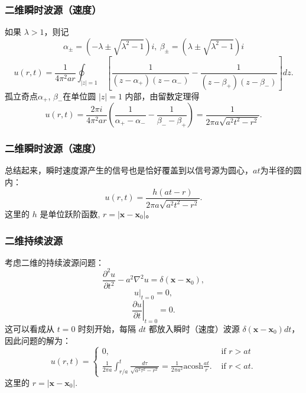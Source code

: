 \documentclass[CJK]{beamer}
\begin{document}
\begin{frame}
  \frametitle{二维瞬时波源（速度）}
  如果 $\lambda>1$，则记 $$\alpha_{\pm} = \left(-\lambda \pm \sqrt{\lambda^2-1}\right)i,\ \beta_{\pm} = \left(\lambda \pm \sqrt{\lambda^2-1}\right)i$$
  $$ u(r,t) = \frac{1}{4\pi^2ar}\oint_{|z|=1}\ \left[\frac{1}{(z-\alpha_+)(z-\alpha_-)}-\frac{1}{(z-\beta_+)(z-\beta_-)}\right]dz.$$
  孤立奇点$\alpha_+$, $\beta_-$在单位圆 $|z|=1$ 内部，由留数定理得
  $$ u(r,t) = \frac{2\pi i}{4\pi^2ar}\left(\frac{1}{\alpha_+-\alpha_-}-\frac{1}{\beta_--\beta_+}\right) = \frac{1}{2\pi a\sqrt{a^2t^2-r^2}}. $$
\end{frame}


\begin{frame}
  \frametitle{二维瞬时波源（速度）}
  总结起来，瞬时速度源产生的信号也是恰好覆盖到以信号源为圆心，$at$为半径的圆内：
  $$ u(r,t) = \frac{h(at-r)}{2\pi a\sqrt{a^2t^2-r^2}}.$$
  这里的 $h$ 是单位跃阶函数, $r=|\mathbf{x}-\mathbf{x}_0|$。
\end{frame}


\begin{frame}
  \frametitle{二维持续波源}
  考虑二维的持续波源问题：
  $$\frac{\partial^2u}{\partial t^2}-a^2\nabla^2 u = \delta(\mathbf{x}-\mathbf{x}_0), $$
  $$\left. u\right\vert_{t=0} = 0,$$
  $$\left. \frac{\partial u}{\partial t}\right\vert_{t=0} = 0.$$
  这可以看成从  $t =0$ 时刻开始，每隔 $dt$ 都放入瞬时（速度）波源 $\delta(\mathbf{x}-\mathbf{x}_0) dt$，因此问题的解为：
  $$u(r,t) = \left\{
  \begin{array}{ll}
    0, & \text{ if } r>at \\
    \frac{1}{2\pi a}\int_{r/a}^t \frac{d\tau}{\sqrt{a^2\tau^2-r^2}}=\frac{1}{2\pi a^2}\mathrm{acosh}\frac{at}{r}. & \text{ if } r< at.
  \end{array}
  \right.$$
  这里的 $r = |\mathbf{x}-\mathbf{x}_0|$.
\end{frame}


\ech
\end{document}
